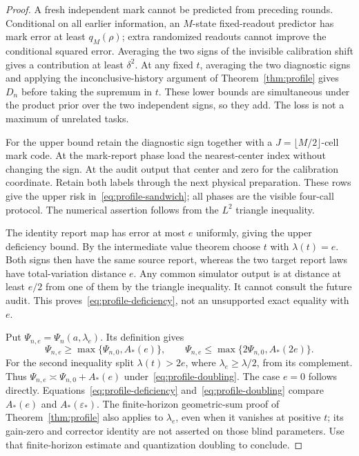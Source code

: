 \begin{proof}
A fresh independent mark cannot be predicted from preceding rounds. Conditional on all earlier information, an $M$-state fixed-readout predictor has mark error at least $q_M(\rho)$; extra randomized readouts cannot improve the conditional squared error. Averaging the two signs of the invisible calibration shift gives a contribution at least $\delta^2$. At any fixed $t$, averaging the two diagnostic signs and applying the inconclusive-history argument of Theorem~\ref{thm:profile} gives $D_n$ before taking the supremum in $t$. These lower bounds are simultaneous under the product prior over the two independent signs, so they add. The loss is not a maximum of unrelated tasks.

For the upper bound retain the diagnostic sign together with a $J=\lfloor M/2\rfloor$-cell mark code. At the mark-report phase load the nearest-center index without changing the sign. At the audit output that center and zero for the calibration coordinate. Retain both labels through the next physical preparation. These rows give the upper risk in~\eqref{eq:profile-sandwich}; all phases are the visible four-call protocol. The numerical assertion follows from the $L^2$ triangle inequality.

The identity report map has error at most $e$ uniformly, giving the upper deficiency bound. By the intermediate value theorem choose $t$ with $\lambda(t)=e$. Both signs then have the same source report, whereas the two target report laws have total-variation distance $e$. Any common simulator output is at distance at least $e/2$ from one of them by the triangle inequality. It cannot consult the future audit. This proves~\eqref{eq:profile-deficiency}, not an unsupported exact equality with $e$.

Put $\Psi_{n,e}=\Psi_n(a,\lambda_e)$. Its definition gives
\[
 \Psi_{n,e}\ge\max\{\Psi_{n,0},A_*(e)\},\qquad
 \Psi_{n,e}\le\max\{2\Psi_{n,0},A_*(2e)\}.
\]
For the second inequality split $\lambda(t)>2e$, where $\lambda_e\ge\lambda/2$, from its complement. Thus $\Psi_{n,e}\asymp\Psi_{n,0}+A_*(e)$ under~\eqref{eq:profile-doubling}. The case $e=0$ follows directly. Equations~\eqref{eq:profile-deficiency} and~\eqref{eq:profile-doubling} compare $A_*(e)$ and $A_*(\varepsilon_*)$. The finite-horizon geometric-sum proof of Theorem~\ref{thm:profile} also applies to $\lambda_e$, even when it vanishes at positive $t$; its gain-zero and corrector identity are not asserted on those blind parameters. Use that finite-horizon estimate and quantization doubling to conclude.
\end{proof}

